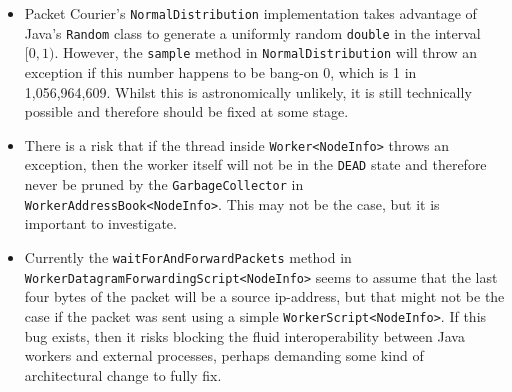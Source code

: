 \begin{itemize}
    \item Packet Courier's \texttt{NormalDistribution} implementation takes advantage of Java's
    \texttt{Random}\cite{java_Random} class to generate a uniformly random \texttt{double} in the interval $[0, 1)$.
    However, the \texttt{sample} method in \texttt{NormalDistribution} will throw an exception if this number happens
    to be bang-on 0, which is 1 in 1,056,964,609\cite{floating_point_numbers_in_normal_interval}. Whilst this is
    astronomically unlikely, it is still technically possible and therefore should be fixed at some stage.
    \item There is a risk that if the thread inside \texttt{Worker<NodeInfo>} throws an exception, then the worker
    itself will not be in the \texttt{DEAD} state and therefore never be pruned by the \texttt{GarbageCollector} in
    \texttt{WorkerAddressBook<NodeInfo>}. This may not be the case, but it is important to investigate.
    \item Currently the \texttt{waitForAndForwardPackets} method in \texttt{WorkerDatagramForwardingScript<NodeInfo>}
    seems to assume that the last four bytes of the packet will be a source ip-address, but that might not be the
    case if the packet was sent using a simple \texttt{WorkerScript<NodeInfo>}. If this bug exists, then it risks
    blocking the fluid interoperability between Java workers and external processes, perhaps demanding some kind of
    architectural change to fully fix.
\end{itemize}
